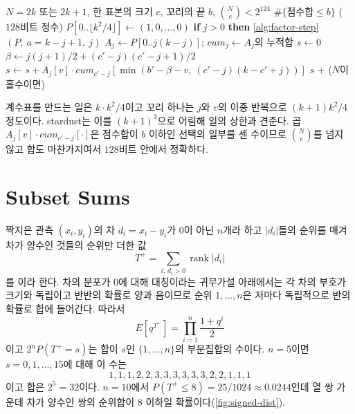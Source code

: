 \begin{algorithm}[htbp]
\begin{algorithmic}[1]
\Require $N=2k$ 또는 $2k+1$, 한 표본의 크기 $c$, 꼬리의 끝 $b$, $\binom Nc<2^{124}$
\Ensure $\#\{\text{점수합}\le b\}$ ($128$비트 정수)
\State $P[0..\lfloor k^2/4\rfloor]\gets(1,0,\dots,0)$ 
 
  \State \textbf{if} $j>0$ \textbf{then} \cref{alg:factor-step}$(P,\ a=k-j+1,\ j)$
  \State $A_j\gets P[0..j(k-j)]$; $\mathit{cum}_j\gets A_j$의 누적합
\EndFor
{} 
  \State $s\gets0$
    \State $\beta\gets j(j+1)/2+(c'-j)(c'-j+1)/2$
      \State $s\gets s+A_j[v]\cdot\mathit{cum}_{c'-j}[\min(b'-\beta-v,\ (c'-j)(k-c'+j))]$
    \EndFor
  \EndFor
  \State \Return $s$
\EndFunction
\State \Return {} $+$ ($N$이 홀수이면) 
\end{algorithmic}
\caption{Ansari--Bradley 점수합의 꼬리 (stardust )}
\label{alg:ansari}
\end{algorithm}

계수표를 만드는 일은 $k\cdot k^2/4$이고 꼬리 하나는 $j$와 $v$의 이중 반복으로 $(k+1)k^2/4$ 정도이다. stardust는 이를 $(k+1)^3$으로 어림해 일의 상한과 견준다. 곱 $A_j[v]\cdot\mathit{cum}_{c'-j}[\cdot]$은 점수합이 $b$ 이하인 선택의 일부를 센 수이므로 $\binom Nc$를 넘지 않고 합도 마찬가지여서 $128$비트 안에서 정확하다.

\section{Subset Sums}
\label{sec:signed-rank}

짝지은 관측 $(x_i,y_i)$의 차 $d_i=x_i-y_i$가 $0$이 아닌 $n$개라 하고 $|d_i|$들의 순위를 매겨 차가 양수인 것들의 순위만 더한 값
\[
T^+=\sum_{i:\,d_i>0}\operatorname{rank}|d_i|
\]
를 이라 한다\cite{wilcoxon1945}. 차의 분포가 $0$에 대해 대칭이라는 귀무가설 아래에서는 각 차의 부호가 크기와 독립이고 반반의 확률로 양과 음이므로 순위 $1,\dots,n$은 저마다 독립적으로 반의 확률로 합에 들어간다. 따라서
\begin{equation}
\label{eq:signed-rank-gf}
E[q^{T^+}]=\prod_{i=1}^n\frac{1+q^i}2
\end{equation}
이고 $2^nP(T^+=s)$는 합이 $s$인 $\{1,\dots,n\}$의 부분집합의 수이다. $n=5$이면 $s=0,1,\dots,15$에 대해 이 수는
\[
1,1,1,2,2,3,3,3,3,3,3,2,2,1,1,1
\]
이고 합은 $2^5=32$이다. $n=10$에서 $P(T^+\le8)=25/1024\approx0.0244$인데 열 쌍 가운데 차가 양수인 쌍의 순위합이 $8$ 이하일 확률이다(\cref{fig:signed-dist}).

